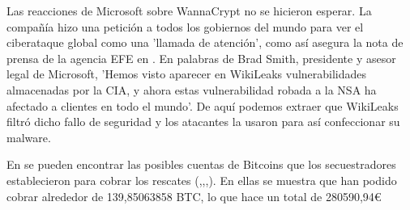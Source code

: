 Las reacciones de Microsoft sobre WannaCrypt no se hicieron esperar. La compañía hizo una petición a todos los gobiernos del mundo para ver el ciberataque global como una 'llamada de atención', como así asegura la nota de prensa de la agencia EFE en \cite{vg}. En palabras de Brad Smith, presidente y asesor legal de Microsoft, 'Hemos visto aparecer en WikiLeaks vulnerabilidades almacenadas por la CIA, y ahora estas vulnerabilidad robada a la NSA ha afectado a clientes en todo el mundo'. De aquí podemos extraer que WikiLeaks filtró dicho fallo de seguridad y los atacantes la usaron para así confeccionar su malware.

En \cite{elhacker} se pueden encontrar las posibles cuentas de Bitcoins que los secuestradores establecieron para cobrar los rescates (\cite{b1},\cite{b2},\cite{b3},\cite{b4}). En ellas se muestra que han podido cobrar alrededor de 139,85063858 BTC, lo que hace un total de 280590,94\euro